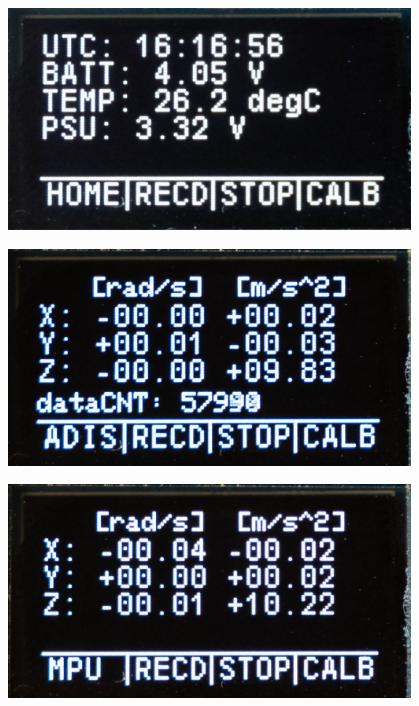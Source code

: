\documentclass[%
  12pt,       				%
	t,                  %
	aspectratio=1610,   %
	unicode,						%
]{beamer}				    	%
\begin{document}
\begin{frame}
\begin{columns}[T]
\begin{column}{0.5\textwidth}
\begin{itemize}
				
			\end{itemize}
		\end{column}
		\begin{column}{0.25\textwidth}		%
			\begin{figure}%
				\centering
			    \includegraphics[width=1\columnwidth]{obrazky/menuHome}
			\end{figure}
			\begin{figure}%
				\centering
			    \includegraphics[width=1\columnwidth]{obrazky/menuADIS}
			\end{figure}
			\begin{figure}%
				\centering
			    \includegraphics[width=1\columnwidth]{obrazky/menuMPU}
			\end{figure}


\end{column}
\end{columns}
\end{frame}
\end{document}
